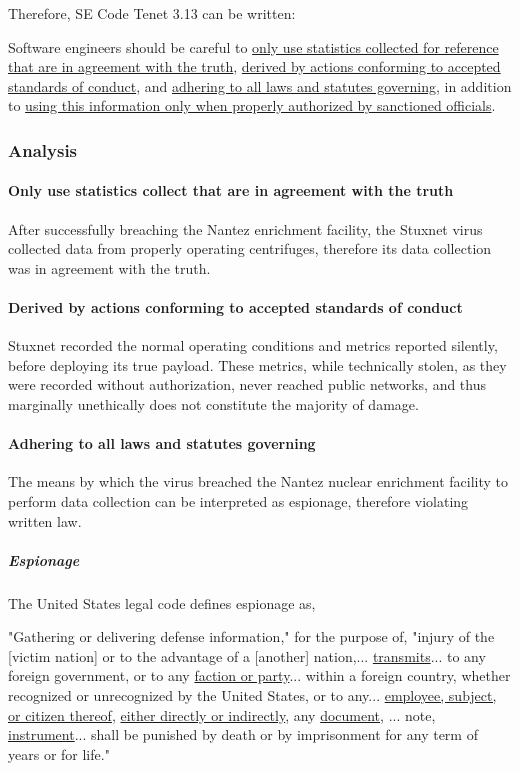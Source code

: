\documentclass[12pt]{article}
\begin{document}
\begin{multicols}{2}
Therefore, SE Code Tenet 3.13 can be written:
\begin{framed}
Software engineers should be careful to \ul{only use statistics collected for reference that are in agreement with the truth}, \ul{derived by actions conforming to accepted standards of conduct}, and \ul{adhering to all laws and statutes governing}, in addition to \ul{using this information only when properly authorized by sanctioned officials}.
\end{framed}

\subsubsection{Analysis}

\paragraph{Only use statistics collect that are in agreement with the truth}

After successfully breaching the Nantez enrichment facility, the Stuxnet virus collected data from properly operating centrifuges, therefore its data collection was in agreement with the truth.

\paragraph{Derived by actions conforming to accepted standards of conduct}

Stuxnet recorded the normal operating conditions and metrics reported silently, before deploying its true payload. These metrics, while technically stolen, as they were recorded without authorization, never reached public networks, and thus marginally unethically does not constitute the majority of damage.

\paragraph{Adhering to all laws and statutes governing}

The means by which the virus breached the Nantez nuclear enrichment facility to perform data collection can be interpreted as espionage, therefore violating written law.

\subparagraph{Espionage}

The United States legal code defines espionage as,

\begin{displayquote}
"Gathering or delivering defense information," for the purpose of, "injury of the [victim nation] or to the advantage of a [another] nation,... \ul{transmits}... to any foreign government, or to any \ul{faction or party}... within a foreign country, whether recognized or unrecognized by the United States, or to any... \ul{employee, subject, or citizen thereof}, \ul{either directly or indirectly}, any \ul{document}, ... note, \ul{instrument}... shall be punished by death or by imprisonment for any term of years or for life."\cite{USEspionageLegalDefinition}
\end{displayquote}


\end{multicols}
\end{document}
